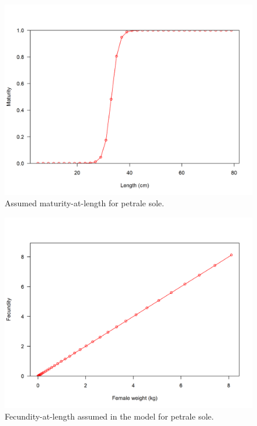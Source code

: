\documentclass[12pt,]{article}
\begin{document}
\FloatBarrier

\begin{figure}
\centering
\includegraphics{r4ss/plots_mod1/bio6_maturity.png}
\caption{Assumed maturity-at-length for petrale sole.
\label{fig:maturity}}
\end{figure}

\FloatBarrier

\begin{figure}
\centering
\includegraphics{r4ss/plots_mod1/bio8_fecundity_wt.png}
\caption{Fecundity-at-length assumed in the model for petrale sole.
\label{fig:fecundity_model}}
\end{figure}
\end{document}
